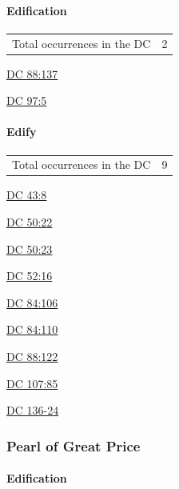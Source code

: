 		\paragraph{Edification}
	
			\begin{tabular}{ll}
				Total occurrences in the DC & 2
			\end{tabular}
			
			\begin{compactdesc}
				\item[{\hyperref[DC88-137]{DC 88:137}}]
				\item[{\hyperref[DC97-5]{DC 97:5}}]
			\end{compactdesc}
			
		\paragraph{Edify}
	
			\begin{tabular}{ll}
				Total occurrences in the DC & 9
			\end{tabular}
			
			\begin{compactdesc}
				\item[{\hyperref[DC43-8]{DC 43:8}}]
				\item[{\hyperref[DC50-22]{DC 50:22}}]
				\item[{\hyperref[DC50-23]{DC 50:23}}]
				\item[{\hyperref[DC52-16]{DC 52:16}}]
				\item[{\hyperref[DC84-106]{DC 84:106}}]
				\item[{\hyperref[DC84-110]{DC 84:110}}]
				\item[{\hyperref[DC88-122]{DC 88:122}}]
				\item[{\hyperref[DC107-85]{DC 107:85}}]
				\item[{\hyperref[DC136-24]{DC 136-24}}]
			\end{compactdesc}
		
	\subsubsection{Pearl of Great Price} %
		\label{EDIFICATION-PGP}
	
		\paragraph{Edification}
	
